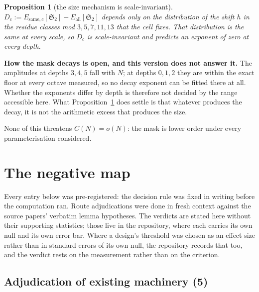 \documentclass[11pt,a4paper]{article}
\theoremstyle{plain}
\newtheorem{proposition}[theorem]{Proposition}
\theoremstyle{definition}
\renewcommand{\SS}{\mathfrak{S}}
\begin{document}
\begin{proposition}[the size mechanism is scale-invariant]
\label{prop:scaleinv}
$D_c := E_{\mathrm{same},c}[\SS_2] - E_{\mathrm{all}}[\SS_2]$ depends
only on the distribution of the shift $h$ in the residue classes mod
$3,5,7,11,13$ that the cell fixes. That distribution is the same at
every scale, so $D_c$ is scale-invariant and predicts an exponent of
zero at every depth.
\end{proposition}

\textbf{How the mask decays is open, and this version does not answer
it.} The amplitudes at depths $3,4,5$ fall with $N$; at depths $0,1,2$
they are within the exact floor at every octave measured, so no decay
exponent can be fitted there at all. Whether the exponents differ by
depth is therefore not decided by the range accessible here. What
Proposition~\ref{prop:scaleinv} does settle is that whatever produces
the decay, it is not the arithmetic excess that produces the size.

None of this threatens $C(N)=o(N)$: the mask is lower order under every
parameterisation considered.

\section{The negative map}\label{sec:closures}

Every entry below was pre-registered: the decision rule was fixed in
writing before the computation ran. Route adjudications were done in
fresh context against the source papers' verbatim lemma hypotheses. The
verdicts are stated here without their supporting statistics; those
live in the repository, where each carries its own null and its own
error bar. Where a design's threshold was chosen as an effect size
rather than in standard errors of its own null, the repository records
that too, and the verdict rests on the measurement rather than on the
criterion.

\subsection{Adjudication of existing machinery (5)}
\end{document}
